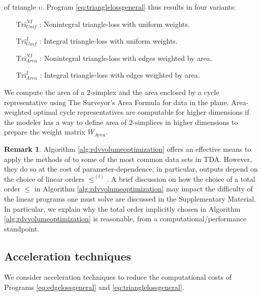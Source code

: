 \documentclass[utf8]{formatting_stuff/frontiersFPHY}
\makeatletter
\newcommand{\NI}{^{NI}}
\newcommand{\I}{^I}
\newcommand{\unif}{_{Unif}}
\newcommand{\area}{_{Area}}
\newcommand{\dimss}[1]{^{(#1)}}
\newcommand{\Tri}{\mathrm{Tri}}
\theoremstyle{plain}
\theoremstyle{definition}
\newtheorem{remark}[theorem]{Remark}
\def\namedlabel#1#2{\begingroup
    #2%
    \def\@currentlabel{#2}%
    \phantomsection\label{#1}\endgroup:
}
\makeatother
\begin{document}
 of triangle $\upsilon$.  Program \eqref{eq:trianglelossgeneral} thus results in four variants:
 
 
\begin{enumerate}[style=multiline]
    \item[\namedlabel{itm:tri_NIU}{$\Tri\NI\unif$}] Nonintegral triangle-loss with uniform weights.
    \item[\namedlabel{itm:tri_IU}{$\Tri\I\unif$}] Integral triangle-loss with uniform weights.
    \item[\namedlabel{itm:tri_NIA}{$\Tri\NI\area$}] Nonintegral triangle-loss with edges weighted by area. 
    \item[\namedlabel{itm:tri_IA}{$\Tri\I\area$}] Integral triangle-loss with edges weighted by area. 
\end{enumerate}
 


 We compute the area of a $2$-simplex and the area enclosed by a cycle representative using The Surveyor's Area Formula \cite{TheSurveyorsAreaFormula} for data in the plane. 
 Area-weighted optimal cycle representatives are computable for higher dimensions if the modeler has a way to define area of $2$-simplices in higher dimensions to prepare the weight matrix $W_{Area}$. 


\begin{remark} Algorithm \ref{alg:rdvvolumeoptimization} offers an effective means to apply the methods of \cite{Obayashi2018} to some of the most common data sets in TDA.  However, they do so at the cost of parameter-dependence; in particular, outputs depend on the choice of linear orders $\le\dimss{l}$.  
 A brief discussion on how the choice of a total order $\le$ in Algorithm \ref{alg:rdvvolumeoptimization} may impact the difficulty of the linear programs one must solve are discussed in the Supplementary Material.  In particular, we explain why the total order implicitly chosen in Algorithm \ref{alg:rdvvolumeoptimization} is reasonable,  from a computational/performance standpoint.
\end{remark}


 
\subsection{Acceleration techniques} \label{acceleratation technique}
 
We consider acceleration techniques to reduce the computational costs of Programs \eqref{eq:edgelossgeneral} and \eqref{eq:trianglelossgeneral}.
\end{document}
